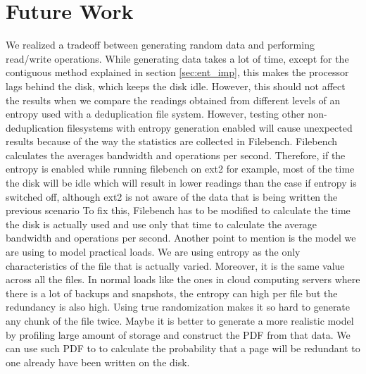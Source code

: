 \chapter{Future Work}\label{chap:fut}
We realized a tradeoff between generating random data and performing read/write operations. While generating data takes a lot of time, except for the contiguous method explained in section \ref{sec:ent_imp}, this makes the processor lags behind the disk, which keeps the disk idle. However, this should not affect the results when we compare the readings obtained from different levels of an entropy used with a deduplication file system.
 However, testing other non-deduplication filesystems with entropy generation enabled will cause unexpected results because of the way the statistics are collected in Filebench.
\newline
\noindent Filebench calculates the averages bandwidth and operations per second.
 Therefore, if the entropy is enabled while running filebench on ext2 for example, most of the time the disk will be idle which will result in lower readings than the case if entropy is switched off, although ext2 is not aware of the data that is being written the previous scenario 
\newline
\noindent To fix this, Filebench has to be modified to calculate the time the disk is actually used and use only that time to calculate the average bandwidth and operations per second.
\newline
\noindent Another point to mention is the model we are using to model practical loads. We are using entropy as the only characteristics of the file that is actually varied.
 Moreover, it is the same value across all the files. In normal loads like the ones in cloud computing servers where there is a lot of backups and snapshots, the entropy can high per file but the redundancy is also high.
 Using true randomization makes it so hard to generate any chunk of the file twice.
 Maybe it is better to generate a more realistic model by profiling large amount of storage and construct the PDF from that data. We can use such PDF to to calculate the probability that a page will be redundant to one already have been written on the disk.
